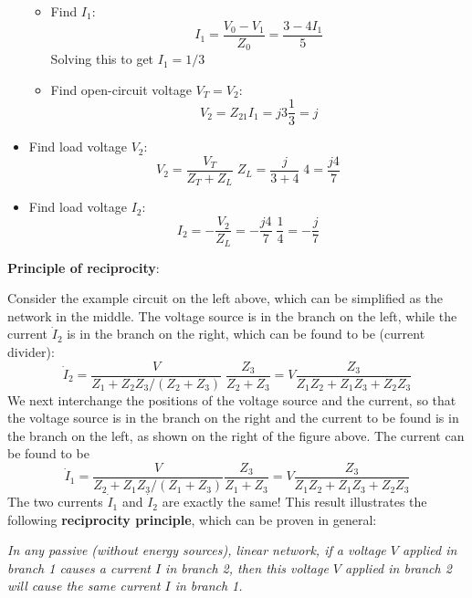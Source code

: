 \documentclass{article}
\begin{document}
\begin{itemize}
\begin{itemize}
  \item Find $I_1$:
    \begin{equation}
      I_1=\frac{V_0-V_1}{Z_0}=\frac{3-4I_1}{5}	
    \end{equation}
    Solving this to get $I_1=1/3$
  \item Find open-circuit voltage $V_T=V_2$:
    \begin{equation}
      V_2=Z_{21}I_1=j3 \frac{1}{3}=j	
    \end{equation}
  \end{itemize}
\item Find load voltage $V_2$:
  \begin{equation}
    V_2=\frac{V_T}{Z_T+Z_L}\;Z_L=\frac{j}{3+4}\;4=\frac{j4}{7} 
  \end{equation}
\item Find load voltage $I_2$:
  \begin{equation}
    I_2=-\frac{V_2}{Z_L}=-\frac{j4}{7}\;\frac{1}{4}=-\frac{j}{7} 
  \end{equation}
\end{itemize}


{\bf Principle of reciprocity}:
 

Consider the example circuit on the left above, which can be simplified 
as the network in the middle. The voltage source is in the branch on the
left, while the current $\dot{I}_2$ is in the branch on the right, which
can be found to be (current divider):
\begin{equation} 
  \dot{I}_2=\frac{V}{Z_1+Z_2 Z_3/(Z_2+Z_3)}\;\frac{Z_3}{Z_2+Z_3}
  =V \frac{Z_3}{Z_1Z_2+Z_1Z_3+Z_2Z_3} 
\end{equation}
We next interchange the positions of the voltage source and the current, 
so that the voltage source is in the branch on the right and the current 
to be found is in the branch on the left, as shown on the right of the 
figure above. The current can be found to be
\begin{equation} 
  \dot{I}_1=\frac{V}{Z_2+Z_1 Z_3/(Z_1+Z_3)}\frac{Z_3}{Z_1+Z_3}
  =V \frac{Z_3}{Z_1Z_2+Z_1Z_3+Z_2Z_3} 
\end{equation}
The two currents $\dot{I}_1$ and $\dot{I}_2$ are exactly the same! This
result illustrates the following {\bf reciprocity principle}, which can 
be proven in general:

{\em 
In any passive (without energy sources), 
linear network, if a voltage $V$ applied in branch 1 causes a current $I$ in 
branch 2, then this voltage $V$ applied in branch 2 will cause the same current
$I$ in branch 1.}
\end{document}
